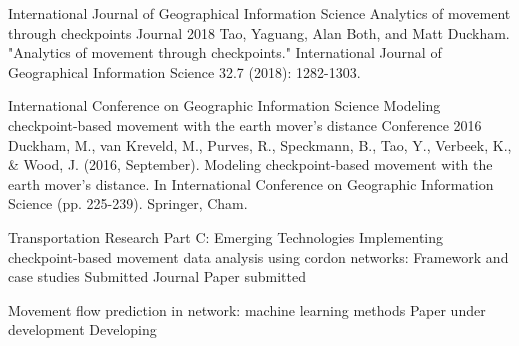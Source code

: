 


\begin{cventries}


\cventry
{International Journal of Geographical Information Science} %
{Analytics of movement through checkpoints} %
{Journal} %
{2018} %
{ %
Tao, Yaguang, Alan Both, and Matt Duckham. "Analytics of movement through checkpoints." International Journal of Geographical Information Science 32.7 (2018): 1282-1303.
}


\cventry
{International Conference on Geographic Information Science} %
{Modeling checkpoint-based movement with the earth mover’s distance} %
{Conference} %
{2016} %
{ %
Duckham, M., van Kreveld, M., Purves, R., Speckmann, B., Tao, Y., Verbeek, K., \& Wood, J. (2016, September). Modeling checkpoint-based movement with the earth mover’s distance. In International Conference on Geographic Information Science (pp. 225-239). Springer, Cham.
}


\cventry
{Transportation Research Part C: Emerging Technologies}
{Implementing checkpoint-based movement data analysis using cordon networks: Framework and case studies}
{Submitted Journal Paper}
{submitted}
{}

\cventry
{}
{Movement flow prediction in network: machine learning methods}
{Paper under development}
{Developing}
{}

\end{cventries}